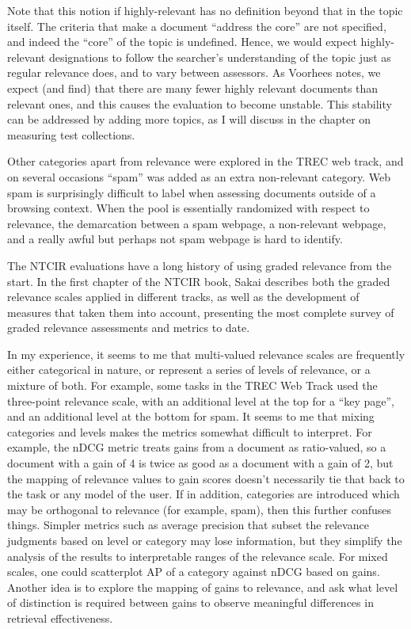 \documentclass[nobib]{tufte-book}
\begin{document}
Note that this notion if highly-relevant has no definition beyond that in the topic itself.  The criteria that make a document ``address the core'' are not specified, and indeed the ``core'' of the topic is undefined.  Hence, we would expect highly-relevant designations to follow the searcher's understanding of the topic just as regular relevance does, and to vary between assessors.  As Voorhees notes, we expect (and find) that there are many fewer highly relevant documents than relevant ones, and this causes the evaluation to become unstable.  This stability can be addressed by adding more topics, as I will discuss in the chapter on measuring test collections.

Other categories apart from relevance were explored in the TREC web track, and on several occasions ``spam'' was added as an extra non-relevant category.  Web spam is surprisingly difficult to label when assessing documents outside of a browsing context.  When the pool is essentially randomized with respect to relevance, the demarcation between a spam webpage, a non-relevant webpage, and a really awful but perhaps not spam webpage is hard to identify.

The NTCIR evaluations have a long history of using graded relevance from the start.  In the first chapter of the NTCIR book\autocite[chapter 1]{sakai_evaluating_2020}, Sakai describes both the graded relevance scales applied in different tracks, as well as the development of measures that taken them into account, presenting the most complete survey of graded relevance assessments and metrics to date.

In my experience, it seems to me that multi-valued relevance scales are frequently either categorical in nature, or represent a series of levels of relevance, or a mixture of both.  For example, some tasks in the TREC Web Track used the three-point relevance scale, with an additional level at the top for a ``key page'', and an additional level at the bottom for spam.  It seems to me that mixing categories and levels makes the metrics somewhat difficult to interpret.  For example, the nDCG metric\autocite{jarvelin_cumulated_2002} treats gains from a document as ratio-valued, so a document with a gain of 4 is twice as good as a document with a gain of 2, but the mapping of relevance values to gain scores doesn't necessarily tie that back to the task or any model of the user.  If in addition, categories are introduced which may be orthogonal to relevance (for example, spam), then this further confuses things.  Simpler metrics such as average precision that subset the relevance judgments based on level or category may lose information, but they simplify the analysis of the results to interpretable ranges of the relevance scale.  For mixed scales, one could scatterplot AP of a category against nDCG based on gains.  Another idea is to explore the mapping of gains to relevance, and ask what level of distinction is required between gains to observe meaningful differences in retrieval effectiveness.
\end{document}
